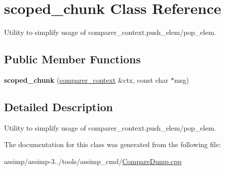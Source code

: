 \hypertarget{classscoped__chunk}{\section{scoped\+\_\+chunk Class Reference}
\label{classscoped__chunk}
}


Utility to simplify usage of comparer\+\_\+context.\+push\+\_\+elem/pop\+\_\+elem.  


\subsection*{Public Member Functions}
\begin{DoxyCompactItemize}
\item 
\hypertarget{classscoped__chunk_a6954445424a2895ec794d146f2fa5d29}{{\bfseries scoped\+\_\+chunk} (\hyperlink{classcomparer__context}{comparer\+\_\+context} \&ctx, const char $\ast$msg)}\label{classscoped__chunk_a6954445424a2895ec794d146f2fa5d29}

\end{DoxyCompactItemize}


\subsection{Detailed Description}
Utility to simplify usage of comparer\+\_\+context.\+push\+\_\+elem/pop\+\_\+elem. 

The documentation for this class was generated from the following file\+:\begin{DoxyCompactItemize}
\item 
assimp/assimp-\/3../tools/assimp\+\_\+cmd/\hyperlink{_compare_dump_8cpp}{Compare\+Dump.\+cpp}\end{DoxyCompactItemize}
